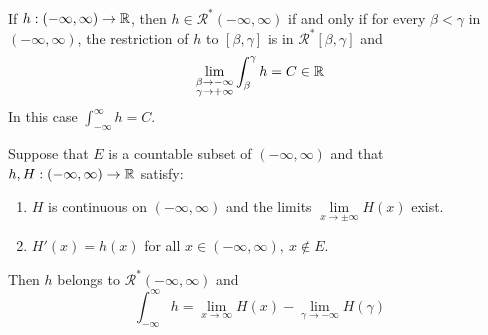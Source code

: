 \begin{theorem}
	If $h:(-\infty,\infty)\to\mathbb{R}$, then $h \in \mathcal{R}^*(-\infty,\infty)$ if and only if for every $\beta < \gamma$ in $(-\infty, \infty)$, the restriction of $h$ to $[\beta,\gamma]$ is in $\mathcal{R}^*[\beta,\gamma]$ and
	\[\lim\limits_{\substack{\beta \to -\infty \\ \gamma \to +\infty}}\displaystyle\int_{\beta}^{\gamma}h=C\in\mathbb{R}\]
	In this case $\displaystyle\int_{-\infty}^{\infty}h=C$.
\end{theorem}

\begin{theorem}
	Suppose that $E$ is a countable subset of $(-\infty, \infty)$ and that $h,H:(-\infty,\infty)\to\mathbb{R}$ satisfy:
	\begin{enumerate}
		\item $H$ is continuous on $(-\infty, \infty)$ and the limits $\lim\limits_{x \to \pm \infty}H(x)$ exist.
		\item $H'(x)=h(x)$ for all $x \in (-\infty, \infty),\ x \notin E$.
	\end{enumerate}
	Then $h$ belongs to $\mathcal{R}^*(-\infty,\infty)$ and
	\[\displaystyle\int_{-\infty}^{\infty}h=\lim\limits_{x \to \infty} H(x)-\lim\limits_{\gamma \to -\infty}H(\gamma)\]
\end{theorem}
